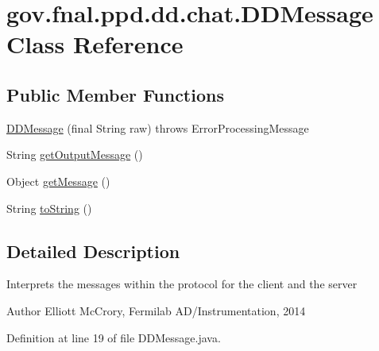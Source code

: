 \hypertarget{classgov_1_1fnal_1_1ppd_1_1dd_1_1chat_1_1DDMessage}{\section{gov.\-fnal.\-ppd.\-dd.\-chat.\-D\-D\-Message Class Reference}
\label{classgov_1_1fnal_1_1ppd_1_1dd_1_1chat_1_1DDMessage}
}
\subsection*{Public Member Functions}
\begin{DoxyCompactItemize}
\item 
\hyperlink{classgov_1_1fnal_1_1ppd_1_1dd_1_1chat_1_1DDMessage_a4e12b6c5ebadc164c409b32516612c61}{D\-D\-Message} (final String raw)  throws Error\-Processing\-Message 
\item 
String \hyperlink{classgov_1_1fnal_1_1ppd_1_1dd_1_1chat_1_1DDMessage_a01b517b9e7b2acc2524cbd92c76d7fa6}{get\-Output\-Message} ()
\item 
Object \hyperlink{classgov_1_1fnal_1_1ppd_1_1dd_1_1chat_1_1DDMessage_ae33fd36c9f1fe620862f668cf58d11cc}{get\-Message} ()
\item 
String \hyperlink{classgov_1_1fnal_1_1ppd_1_1dd_1_1chat_1_1DDMessage_a632b738d2bc786effaa8b5b58aff590f}{to\-String} ()
\end{DoxyCompactItemize}


\subsection{Detailed Description}
Interprets the messages within the protocol for the client and the server

\begin{DoxyAuthor}{Author}
Elliott Mc\-Crory, Fermilab A\-D/\-Instrumentation, 2014 
\end{DoxyAuthor}


Definition at line 19 of file D\-D\-Message.\-java.



